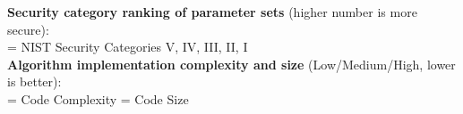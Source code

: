 \documentclass[11pt,english,a4paper, landscape]{scrartcl}
\begin{document}
	\hfill
	\begin{minipage}[t]{0.32\textwidth} %
		\tiny
		{\bfseries Security category ranking of parameter sets} (higher number is more secure):\\[0.5\baselineskip]
		= NIST Security Categories V, IV, III, II, I\\[0.5\baselineskip]
		{\bfseries Algorithm implementation complexity and size} (Low/Medium/High, lower is better):\\[0.25\baselineskip]
		= Code Complexity\quad
		= Code Size
	\end{minipage}



\end{document}
